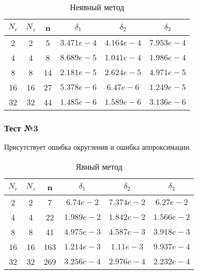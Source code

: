   \begin{table}[H]
    \begin{center}
      \begin{tabular}{*{6}c}
        \toprule
        $ N_r $ & $ N_z $ & n & $ \delta_1 $ & $ \delta_2 $ & $ \delta_3 $ \\
        \midrule
        2 & 2 & 5 & $3.471e-4 $ & $4.164e-4 $ & $7.953e-4 $  \\
        4 & 4 & 8 & $8.689e-5 $ & $1.041e-4 $ & $1.986e-4 $ \\
        8 & 8 & 14 & $2.181e-5 $ & $2.624e-5 $ & $4.971e-5 $ \\
        16 & 16 & 27 & $5.378e-6 $ & $6.47e-6 $ & $1.249e-5 $ \\
        32 & 32 & 44 & $1.485e-6 $ & $1.589e-6 $ & $3.136e-6 $ \\
        \bottomrule
      \end{tabular}
      \caption{Неявный метод}
    \end{center}
  \end{table}

\subsubsection*{Тест №3}

Присутствует ошибка округления и ошибка аппроксимации.

\begin{table}[H]
  \begin{center}
    \begin{tabular}{*{6}c}
      \toprule
      $ N_r $ & $ N_z $ & n & $ \delta_1 $ & $ \delta_2 $ & $ \delta_3 $ \\
      \midrule
      2 & 2 & 7 & $6.74e-2 $ & $7.374e-2 $ & $6.27e-2 $ \\
      4 & 4 & 22 & $1.989e-2 $ & $1.842e-2 $ & $1.566e-2 $ \\
      8 & 8 & 41 & $4.975e-3 $ & $4.587e-3 $ & $3.918e-3 $ \\
      16 & 16 & 163& $1.214e-3 $ & $1.11e-3 $ & $9.937e-4 $ \\
      32 & 32 & 269 & $3.256e-4 $ & $2.976e-4 $ & $2.232e-4 $ \\
      \bottomrule
    \end{tabular}
    \caption{Явный метод}
  \end{center}
\end{table}
  
